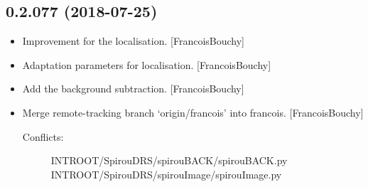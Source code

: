 \documentclass[a4paper,10pt,english]{report}
\begin{document}
\subsection{0.2.077 (2018-07-25)}
\label{\detokenize{misc/changelog:id384}}\begin{itemize}
\item {} 
Improvement for the localisation. {[}FrancoisBouchy{]}

\item {} 
Adaptation parameters for localisation. {[}FrancoisBouchy{]}

\item {} 
Add the background subtraction. {[}FrancoisBouchy{]}

\item {} 
Merge remote-tracking branch ‘origin/francois’ into francois.
{[}FrancoisBouchy{]}
\begin{description}
\item[{Conflicts:}] \leavevmode
{}
INTROOT/SpirouDRS/spirouBACK/spirouBACK.py
INTROOT/SpirouDRS/spirouImage/spirouImage.py

\end{description}

\end{itemize}
\end{document}
